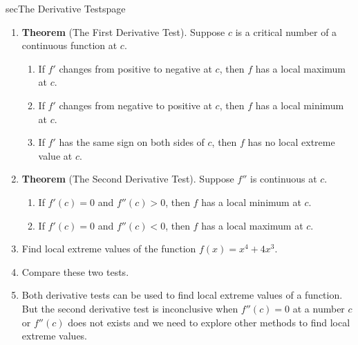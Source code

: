 \documentclass[../main]{subfiles}
\begin{document}
\begin{outline}{sec}{The Derivative Tests}{page}\label{outline:derivative_tests}
  \begin{enumerate}
    \item \textbf{Theorem} (The First Derivative Test). Suppose \(c\) is a critical number of a continuous function at \(c\).
      \begin{mdframed}[style=simple]
        \begin{enumerate}[label=(\alph*)]
          \item If \(f'\) changes from positive to negative at \(c\), then \(f\) has a local maximum at \(c\).
          \item If \(f'\) changes from negative to positive at \(c\), then \(f\) has a local minimum at \(c\).
          \item If \(f'\) has the same sign on both sides of \(c\), then \(f\) has no local extreme value at \(c\).
        \end{enumerate}
      \end{mdframed}
        

    \item \textbf{Theorem} (The Second Derivative Test). Suppose \(f''\) is continuous at \(c\). 
      \begin{mdframed}[style=simple]
        \begin{enumerate}[label=(\alph*)]
          \item If \(f'(c) = 0\) and \(f''(c) > 0\), then \(f\) has a local minimum at \(c\).
          \item If \(f'(c) = 0\) and \(f''(c) < 0\), then \(f\) has a local maximum at \(c\).
        \end{enumerate}
      \end{mdframed}
        

    \item Find local extreme values of the function \(f(x) = x^{4} + 4x^{3}\).
    \item Compare these two tests.
    \item {Both derivative tests can be used to find local extreme values of a function. But the second derivative test is inconclusive when \(f''(c) = 0\) at a number \(c\) or \(f''(c)\) does not exists and we need to explore other methods to find local extreme values.}
  \end{enumerate}
\end{outline}
    
\end{document}
